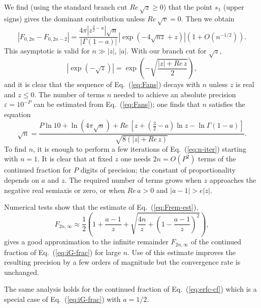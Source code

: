 \documentclass{llncs}
\begin{document}
We find (using the standard branch cut $Re\, \sqrt{z}\geq 0$) that
the point $s_{1}$ (upper signs) gives the dominant contribution unless
$Re\, \sqrt{v}=0$. Then we obtain\begin{equation}
\left|F_{0,2n}-F_{0,2n-2}\right|=\frac{4\pi \left|z^{\frac{3}{2}-a}\right|\sqrt{n}}{\left|\Gamma \left(1-a\right)\right|}\left|\exp \left(-4\sqrt{nz}+z\right)\right|\left(1+O\left(n^{-1/2}\right)\right).\label{eq:Fans}\end{equation}
This asymptotic is valid for $n\gg \left|z\right|$, $\left|a\right|$.
With our branch cut for $\sqrt{z}$, \begin{equation}
\left|\exp \left(-\sqrt{z}\right)\right|=\exp \left(-\sqrt{\frac{\left|z\right|+Re\, z}{2}}\right),\end{equation}
and it is clear that the sequence of Eq.~(\ref{eq:Fans}) decays
with $n$ unless $z$ is real and $z\leq 0$. The number of terms
$n$ needed to achieve an absolute precision $\varepsilon =10^{-P}$
can be estimated from Eq.~(\ref{eq:Fans}); one finds that $n$ satisfies
the equation\begin{equation}
\sqrt{n}=\frac{P\ln 10+\ln \left(4\pi \sqrt{n}\right)+Re\, \left[z+\left(\frac{3}{2}-a\right)\ln z-\ln \Gamma \left(1-a\right)\right]}{\sqrt{8\left(\left|z\right|+Re\, z\right)}}.\label{eq:n-iter}\end{equation}
To find $n$, it is enough to perform a few iterations of Eq.~(\ref{eq:n-iter})
starting with $n=1$. It is clear that at fixed $z$ one needs $2n=O\left(P^{2}\right)$
terms of the continued fraction for $P$ digits of precision; the
constant of proportionality depends on $a$ and $z$. The required
number of terms grows when $z$ approaches the negative real semiaxis
or zero, or when $Re\, a>0$ and $\left|a-1\right|>e\left|z\right|$.

Numerical tests show that the estimate of Eq.~(\ref{eq:Frem-est}),\begin{equation}
F_{2n,\infty }\approx \frac{1}{2}\left(1+\frac{a-1}{z}+\sqrt{\frac{4n}{z}+\left(1-\frac{a-1}{z}\right)^{2}}\right),\end{equation}
 gives a good approximation to the infinite remainder $F_{2n,\infty }$
of the continued fraction of Eq.~(\ref{eq:iG-frac}) for large $n$.
Use of this estimate improves the resulting precision by a few orders
of magnitude but the convergence rate is unchanged.

The same analysis holds for the continued fraction of Eq.~(\ref{eq:erfc-cf})
which is a special case of Eq.~(\ref{eq:iG-frac}) with $a=1/2$.
\end{document}

